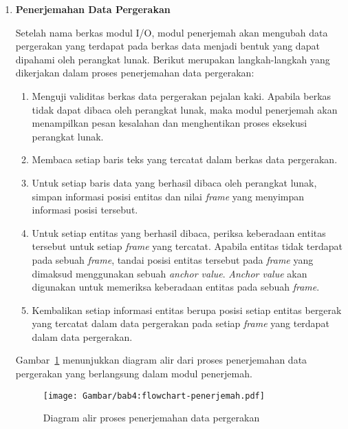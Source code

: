 \begin{enumerate}
    \item \textbf{Penerjemahan Data Pergerakan}
    
    Setelah nama berkas  modul I/O, modul penerjemah akan mengubah data pergerakan yang terdapat pada berkas data menjadi bentuk yang dapat dipahami oleh perangkat lunak. Berikut merupakan langkah-langkah yang dikerjakan dalam proses penerjemahan data pergerakan:
    
    \begin{enumerate}
        \item Menguji validitas berkas data pergerakan pejalan kaki. Apabila berkas tidak dapat dibaca oleh perangkat lunak, maka modul penerjemah akan menampilkan pesan kesalahan dan menghentikan proses eksekusi perangkat lunak.
        
        \item Membaca setiap baris teks yang tercatat dalam berkas data pergerakan.
    
        \item Untuk setiap baris data yang berhasil dibaca oleh perangkat lunak, simpan informasi posisi entitas dan nilai \textit{frame} yang menyimpan informasi posisi tersebut.
        
        \item Untuk setiap entitas yang berhasil dibaca, periksa keberadaan entitas tersebut untuk setiap \textit{frame} yang tercatat. Apabila entitas tidak terdapat pada sebuah \textit{frame}, tandai posisi entitas tersebut pada \textit{frame} yang dimaksud menggunakan sebuah \textit{anchor value}. \textit{Anchor value} akan digunakan untuk memeriksa keberadaan entitas pada sebuah \textit{frame}.
        
        \item Kembalikan setiap informasi entitas berupa posisi setiap entitas bergerak yang tercatat dalam data pergerakan pada setiap \textit{frame} yang terdapat dalam data pergerakan.
    \end{enumerate}
    
    Gambar~\ref{bab4:flowchart-penerjemah} menunjukkan diagram alir dari proses penerjemahan data pergerakan yang berlangsung dalam modul penerjemah.
    
    \begin{figure}[htbp]
        \centering
        \texttt{[image: Gambar/bab4:flowchart-penerjemah.pdf]}
        \caption{Diagram alir proses penerjemahan data pergerakan}
        \label{bab4:flowchart-penerjemah}
    \end{figure}


\end{enumerate}
